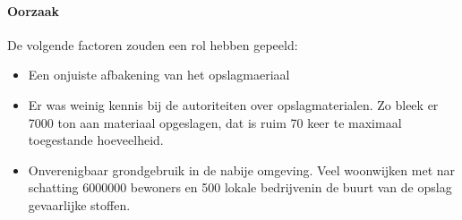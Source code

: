 \documentclass{article}
\begin{document}
	\paragraph{Oorzaak}

	De volgende factoren zouden een rol hebben gepeeld:
	\begin{itemize}
		\item Een onjuiste afbakening van het opslagmaeriaal
		\item Er was  weinig kennis bij de autoriteiten over  opslagmaterialen. Zo bleek er 7000 ton aan materiaal opgeslagen, dat is ruim 70 keer te maximaal toegestande hoeveelheid. 
		\item Onverenigbaar grondgebruik in de nabije omgeving. Veel woonwijken met nar schatting 6000000 bewoners en 500 lokale bedrijvenin de buurt van de opslag gevaarlijke stoffen.
	\end{itemize}
\end{document}
